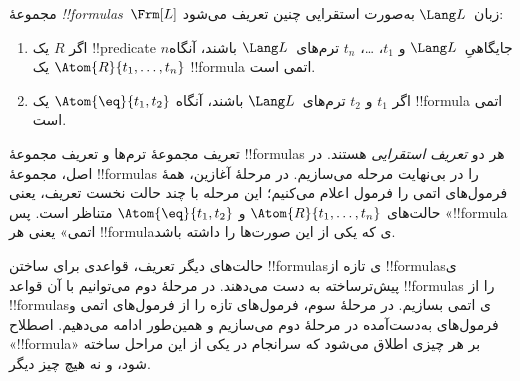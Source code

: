 \documentclass[../../../include/open-logic-section]{subfiles}
\begin{document}
\begin{defn}[فرمول‌ها]
مجموعهٔ \emph{!!{formula}s}~$\Frm[L]$ زبان~$\Lang L$ به‌صورت استقرایی
چنین تعریف می‌شود:
\begin{enumerate}


\item اگر $R$ یک !!{predicate} $n$جایگاهیِ~$\Lang L$ و $t_1$، \dots،
  $t_n$ ترم‌های~$\Lang L$ باشند، آنگاه $\Atom{R}{t_1,\ldots, t_n}$ یک
  !!{formula} اتمی است.

\item اگر $t_1$ و $t_2$ ترم‌های~$\Lang L$ باشند، آنگاه
  $\Atom{\eq}{t_1, t_2}$ یک !!{formula} اتمی است.








\end{enumerate}
\end{defn}

\begin{explain}
تعریف مجموعهٔ ترم‌ها و تعریف مجموعهٔ !!{formula}s هر دو \emph{تعریف
استقرایی} هستند. در اصل، مجموعهٔ !!{formula}s را در بی‌نهایت مرحله
می‌سازیم. در مرحلهٔ آغازین، همهٔ فرمول‌های اتمی را فرمول اعلام می‌کنیم؛ این
مرحله با چند حالت نخست تعریف، یعنی حالت‌های
%
%
$\Atom{R}{t_1,\dots,t_n}$ و $\Atom{\eq}{t_1,t_2}$ متناظر است. پس
«!!{formula} اتمی» یعنی هر !!{formula}ی که یکی از این صورت‌ها را داشته باشد.

حالت‌های دیگر تعریف، قواعدی برای ساختن !!{formula}sی تازه از
!!{formula}sی پیش‌ترساخته به دست می‌دهند. در مرحلهٔ دوم می‌توانیم با آن
قواعد !!{formula}s را از !!{formula}sی اتمی بسازیم. در مرحلهٔ سوم،
فرمول‌های تازه را از فرمول‌های اتمی و فرمول‌های به‌دست‌آمده در مرحلهٔ دوم
می‌سازیم و همین‌طور ادامه می‌دهیم. اصطلاح «!!{formula}» بر هر چیزی اطلاق
می‌شود که سرانجام در یکی از این مراحل ساخته شود، و نه هیچ چیز دیگر.
\end{explain}
\end{document}
